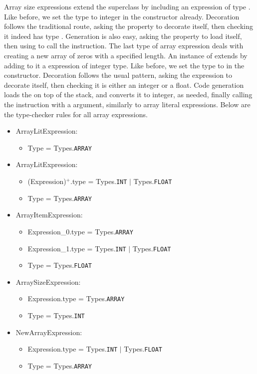 Array size expressions extend the superclass by including an expression of type . Like before, we set the type to integer in the constructor already. Decoration follows the traditional route, asking the  property to decorate itself, then checking it indeed has type . Generation is also easy, asking the  property to load itself, then using  to call the  instruction. The last type of array expression deals with creating a new array of zeros with a specified length. An instance of  extends  by adding to it a  expression of integer type. Like before, we set the type to  in the constructor. Decoration follows the usual pattern, asking the  expression to decorate itself, then checking it is either an integer or a float. Code generation loads the  on top of the stack, and converts it to integer, as needed, finally calling the  instruction with a  argument, similarly to array literal expressions. Below are the type-checker rules for all array expressions.

\begin{itemize}
	\item ArrayLitExpression:
		\begin{itemize}
			\item Type = Types.\texttt{ARRAY}
		\end{itemize}
	\item ArrayLitExpression:
		\begin{itemize}
			\item (Expression)$^+$.type = Types.\texttt{INT} $|$ Types.\texttt{FLOAT}
			\item Type = Types.\texttt{ARRAY}
		\end{itemize}
	\item ArrayItemExpression:
		\begin{itemize}
			\item Expression\_0.type = Types.\texttt{ARRAY}
			\item Expression\_1.type = Types.\texttt{INT} $|$ Types.\texttt{FLOAT}
			\item Type = Types.\texttt{FLOAT}
		\end{itemize}
	\item ArraySizeExpression:
		\begin{itemize}
			\item Expression.type = Types.\texttt{ARRAY}
			\item Type = Types.\texttt{INT}
		\end{itemize}
	\item NewArrayExpression:
		\begin{itemize}
			\item Expression.type = Types.\texttt{INT} $|$ Types.\texttt{FLOAT}
			\item Type = Types.\texttt{ARRAY}
		\end{itemize}
\end{itemize}

